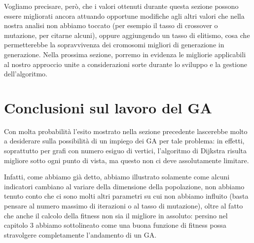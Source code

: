 Vogliamo precisare, per\`o, che i valori ottenuti durante questa sezione possono essere migliorati ancora attuando opportune modifiche agli altri valori che nella nostra analisi non abbiamo toccato (per esempio il tasso di crossover o mutazione, per citarne alcuni), oppure aggiungendo un tasso di elitismo, cosa che permetterebbe la sopravvivenza dei cromosomi migliori di generazione in generazione.
Nella prossima sezione, porremo in evidenza le migliorie applicabili al nostro approccio unite a considerazioni sorte durante lo sviluppo e la gestione dell'algoritmo.
\section{Conclusioni sul lavoro del GA}
Con molta probabilit\`a l'esito mostrato nella sezione precedente lascerebbe molto a desiderare sulla possibilit\`a di un impiego dei GA per tale problema: in effetti, soprattutto per grafi con numero esiguo di vertici, l'algoritmo di Dijkstra risulta migliore sotto ogni punto di vista, ma questo non ci deve assolutamente limitare.

Infatti, come abbiamo gi\`a detto, abbiamo illustrato solamente come alcuni indicatori cambiano al variare della dimensione della popolazione, non abbiamo tenuto conto che ci sono molti altri parametri su cui non abbiamo influito (basta pensare al numero massimo di iterazioni o al tasso di mutazione), oltre al fatto che anche il calcolo della fitness non sia il migliore in assoluto: persino nel capitolo 3 abbiamo sottolineato come una buona funzione di fitness possa stravolgere completamente l'andamento di un GA.
\vspace{3mm}

